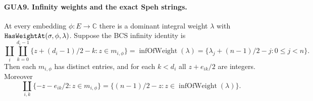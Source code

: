 \documentclass[11pt,a4paper]{article}
\numberwithin{equation}{section}
\theoremstyle{remark}\newtheorem{remark}[theorem]{Remark}
\begin{document}
\paragraph{GUA9. Infinity weights and the exact Speh strings.}
\label{claim:GUA9}
At every embedding $\phi:E\to\mathbb C$ there is a
dominant integral weight $\lambda$ with
$\texttt{Has\allowbreak Weight\allowbreak At}(\sigma,\phi,\lambda)$.  Suppose
the BCS infinity identity is
\[
 \coprod_i\coprod_{k=0}^{d_i-1}
       \{z+(d_i-1)/2-k:z\in m_{i,\phi}\}
     =\operatorname{infOfWeight}(\lambda)
     =\{\lambda_j+(n-1)/2-j:0\leq j<n\}.           \tag{GUA.15}
\]
Then each $m_{i,\phi}$ has distinct entries, and for
each $k<d_i$ all $z+e_{ik}/2$ are integers.  Moreover
\[
 \coprod_{i,k}\{-z-e_{ik}/2:z\in m_{i,\phi}\}
   =\{(n-1)/2-z:z\in\operatorname{infOfWeight}(\lambda)\}.
                                                        \tag{GUA.16}
\]
\end{document}
